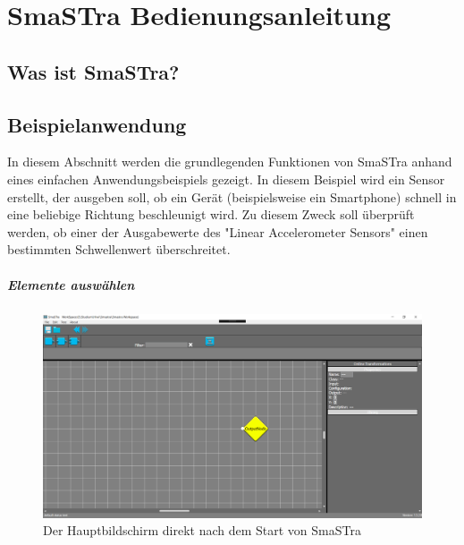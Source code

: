 \chapter{SmaSTra Bedienungsanleitung}

\section{Was ist SmaSTra?}



\section{Beispielanwendung}

In diesem Abschnitt werden die grundlegenden Funktionen von SmaSTra anhand eines einfachen Anwendungsbeispiels gezeigt. 
In diesem Beispiel wird ein Sensor erstellt, der ausgeben soll, ob ein Ger\"at (beispielsweise ein Smartphone) schnell in eine beliebige Richtung beschleunigt wird.
Zu diesem Zweck soll \"uberpr\"uft werden, ob einer der Ausgabewerte des "Linear Accelerometer Sensors" einen bestimmten Schwellenwert \"uberschreitet.

\paragraph{Elemente ausw\"ahlen}

\begin{figure}[h!]
	\centering
		\includegraphics[width = \textwidth]{Manual/01_startup}
	\caption{Der Hauptbildschirm direkt nach dem Start von SmaSTra}
	\label{fig:manual_01_startup}
\end{figure}

